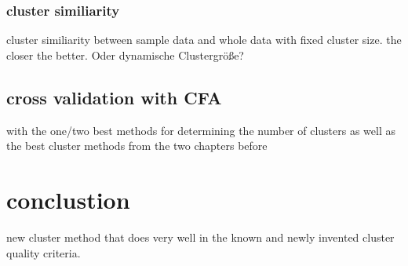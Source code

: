    \subsection{cluster similiarity}
   cluster similiarity between sample data and whole data with fixed cluster size. the closer the better. Oder dynamische Clustergröße?
   \section{cross validation with CFA}
with the one/two best methods for determining the number of clusters as well as the best cluster methods from the two chapters before 

\chapter{conclustion}
new cluster method that does very well in the known and newly invented cluster quality criteria. 
